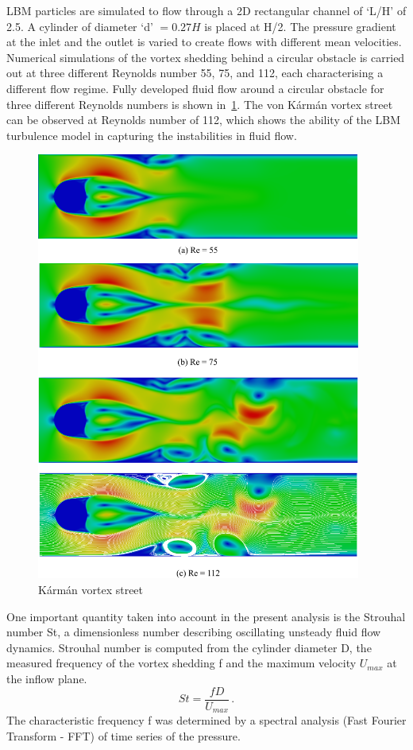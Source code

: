 LBM particles are simulated to flow through a 2D rectangular channel of `L/H' 
of 2.5. A cylinder of diameter `d' $=0.27H$ is placed at H/2. The pressure 
gradient at the inlet and the outlet is varied to create flows with different 
mean velocities. Numerical simulations of the vortex shedding behind a circular 
obstacle is carried out at three different Reynolds number 55, 75, and 112, 
each characterising a different flow regime. Fully developed fluid flow around 
a circular obstacle for three different Reynolds numbers is shown 
in~\cref{fig:karman}. The von K\'{a}rm\'{a}n vortex street can be observed at 
Reynolds number of 112, which shows the ability of the LBM turbulence model in 
capturing the instabilities in fluid flow.
%
\begin{figure}[htbp]
	\centering
	\includegraphics[width=0.95\textwidth]{karman}
	\caption{K\'{a}rm\'{a}n vortex street}
	\label{fig:karman}
\end{figure}

One important quantity taken into account in the present analysis is the 
Strouhal number St, a dimensionless number describing oscillating unsteady 
fluid flow dynamics. Strouhal number is computed from the cylinder diameter D, 
the measured frequency of the vortex shedding f and the maximum velocity 
$U_{max}$ at the inflow plane.
%
\begin{equation}
St=\frac{fD}{U_{max}}\,.
\end{equation}
The characteristic frequency f was determined by a spectral analysis (Fast 
Fourier Transform - FFT) of time series of the pressure. 


